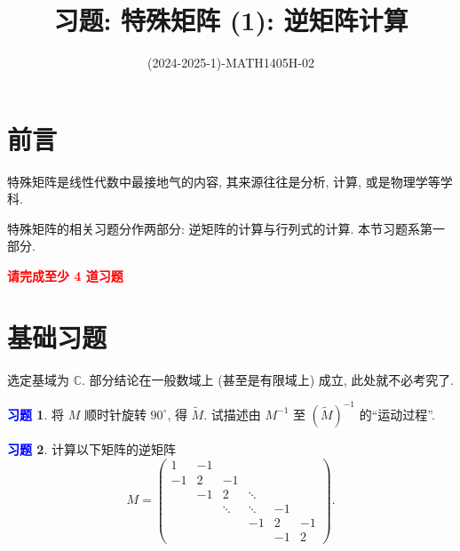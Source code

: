 \documentclass[11pt]{ctexart}
\title{习题: 特殊矩阵 (1): 逆矩阵计算}
\author{(2024-2025-1)-MATH1405H-02}
\theoremstyle{definition}
\numberwithin{equation}{section}
\theoremstyle{definition}
\newtheorem{exercise}{\textcolor{blue}{习题}}
\theoremstyle{remark}
\begin{document}
\maketitle

\vspace{5cm}

\section*{前言}

\begin{pinked}
特殊矩阵是线性代数中最接地气的内容, 其来源往往是分析, 计算, 或是物理学等学科.
\end{pinked}

特殊矩阵的相关习题分作两部分: 逆矩阵的计算与行列式的计算. 本节习题系第一部分. 

\begin{center}
    \textcolor{red}{\textbf{请完成至少 4 道习题}}
\end{center}

\newpage

\section{基础习题}

\begin{pinked}
    选定基域为 $\mathbb C$. 部分结论在一般数域上 (甚至是有限域上) 成立, 此处就不必考究了.
\end{pinked}

\begin{exercise}
    将 $M$ 顺时针旋转 $90^\circ$, 得 $\widetilde M$. 试描述由 $M^{-1}$ 至 $\left(\widetilde M\right)^{-1}$ 的``运动过程''.
\end{exercise}

\begin{exercise}
计算以下矩阵的逆矩阵
\begin{equation}
    M=\begin{pmatrix}
        1 & -1 &  &  &  & \\
        -1 & 2 & -1 &  &  & \\
         & -1 & 2 & \ddots  &  & \\
         &  & \ddots  & \ddots  & -1 & \\
         &  &  & -1 & 2 & -1\\
         &  &  &  & -1 & 2
        \end{pmatrix}.
\end{equation}
\end{exercise}
\end{document}
